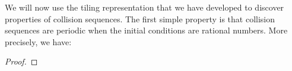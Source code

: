 We will now use the tiling representation that we have developed to discover properties of collision sequences. The first simple property is that collision sequences are periodic when the initial conditions are rational numbers. More precisely, we have:

\begin{theorem}
  
\end{theorem}
\begin{proof}

\end{proof}
